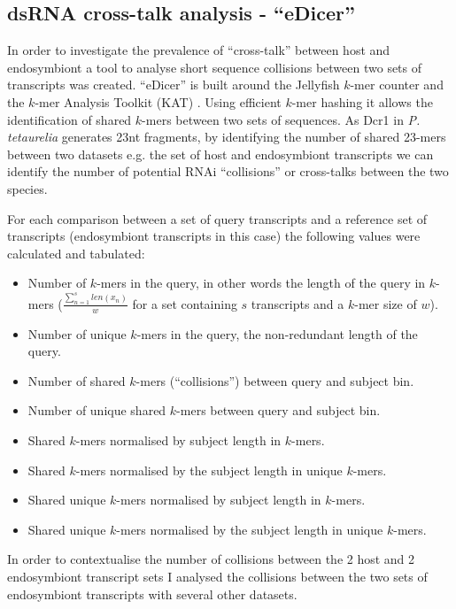 \subsection{dsRNA cross-talk analysis - ``eDicer''}

In order to investigate the prevalence of ``cross-talk'' between 
host and endosymbiont a tool to analyse short sequence collisions between two sets
of transcripts was created.  ``eDicer'' is built around 
the Jellyfish \(k\)-mer counter \citep{Marcais2011} 
and the \(k\)-mer Analysis Toolkit (KAT) \citep{ClavijoKAT}.  Using efficient
\(k\)-mer hashing it allows the identification of shared \(k\)-mers between
two sets of sequences.  As Dcr1 in \textit{P. tetaurelia} generates
23nt fragments, by identifying the number of shared 23-mers between
two datasets e.g. the set of host and endosymbiont transcripts 
we can identify the number of potential RNAi ``collisions'' or cross-talks
between the two species. 

For each comparison between a set of query transcripts and a reference
set of transcripts (endosymbiont transcripts in this case)
the following
values were calculated and tabulated:
\begin{itemize}
    \item Number of \(k\)-mers in the query, in other words the length of the query
        in \(k\)-mers (\(\frac{\sum^s_{n=1} len(x_{n})}{w}\)
        for a set containing \(s\) transcripts and a \(k\)-mer size of \(w\)).
    \item Number of unique \(k\)-mers in the query, the non-redundant length of 
        the query.
    \item Number of shared  \(k\)-mers (``collisions'') between query and subject bin.
    \item Number of unique shared \(k\)-mers between query and subject bin.
    \item Shared \(k\)-mers normalised by subject length in \(k\)-mers.
    \item Shared \(k\)-mers normalised by the subject length in unique \(k\)-mers.
    \item Shared unique \(k\)-mers normalised by subject length in \(k\)-mers.
    \item Shared unique \(k\)-mers normalised by the subject length in unique \(k\)-mers.
\end{itemize}

In order to contextualise the number of collisions between the 2
host and 2 endosymbiont transcript sets
I analysed the collisions between the two sets of endosymbiont transcripts 
with several other datasets.  

